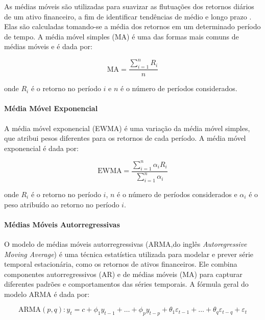                 \ipar As médias móveis são utilizadas para suavizar as flutuações dos retornos diários de um ativo financeiro, a fim de identificar tendências de médio e longo prazo \cite{vukovic2020neural}. Elas são calculadas tomando-se a média dos retornos em um determinado período de tempo. A média móvel simples (\acrshort{MA}) é uma das formas mais comuns de médias móveis e é dada por:

                \begin{equation}
                    \text{MA} = \frac{{\sum_{i=1}^{n} R_i}}{{n}}
                \end{equation}
                
                onde $R_i$ é o retorno no período $i$ e $n$ é o número de períodos considerados.

            \paragraph{Média Móvel Exponencial}

                \ipar A média móvel exponencial (\acrshort{EWMA}) é uma variação da média móvel simples, que atribui pesos diferentes para os retornos de cada período. A média móvel exponencial é dada por:

                \begin{equation}
                    \text{EWMA} = \frac{{\sum_{i=1}^{n} \alpha_i R_i}}{{\sum_{i=1}^{n} \alpha_i}}
                \end{equation}

                \noindent onde $R_i$ é o retorno no período $i$, $n$ é o número de períodos considerados e $\alpha_i$ é o peso atribuído ao retorno no período $i$.

            \paragraph{Médias Móveis Autorregressivas}

                \ipar O modelo de médias móveis autorregressivas (\acrshort{ARMA},do inglês \textit{Autoregressive Moving Average}) é uma técnica estatística utilizada para modelar e prever série temporal estacionária, como os retornos de ativos financeiros. Ele combina componentes autorregressivos (AR) e de médias móveis (MA) para capturar diferentes padrões e comportamentos das séries temporais. A fórmula geral do modelo ARMA é dada por:

                \begin{equation}
                    \text{ARMA}(p, q) : y_t = c + \phi_1 y_{t-1} + \ldots + \phi_p y_{t-p} + \theta_1 \varepsilon_{t-1} + \ldots + \theta_q \varepsilon_{t-q} + \varepsilon_t
                \end{equation}

